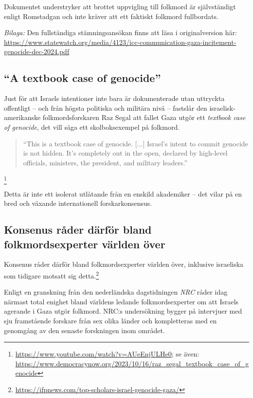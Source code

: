 \documentclass[12pt]{article}
\begin{document}
Dokumentet understryker att brottet uppvigling till folkmord är självständigt enligt Romstadgan och inte kräver att ett faktiskt folkmord fullbordats.

\textit{Bilaga:} Den fullständiga stämningsansökan finns att läsa i originalversion här: \url{https://www.statewatch.org/media/4123/icc-communication-gaza-incitement-genocide-dec-2024.pdf}


\subsection{“A textbook case of genocide”}

Just för att Israels intentioner inte bara är dokumenterade utan uttryckta offentligt – och från högsta politiska och militära nivå – fastslår den israelisk-amerikanske folkmordsforskaren Raz Segal att fallet Gaza utgör ett \textit{textbook case of genocide}, det vill säga ett skolboksexempel på folkmord.

\begin{quote}
“This is a textbook case of genocide. [...] Israel’s intent to commit genocide is not hidden. It’s completely out in the open, declared by high-level officials, ministers, the president, and military leaders.”
\end{quote}

\footnote{\url{https://www.youtube.com/watch?v=AUeEnjULHe0}; se även: \url{https://www.democracynow.org/2023/10/16/raz_segal_textbook_case_of_genocide}}

Detta är inte ett isolerat utlåtande från en enskild akademiker – det vilar på en bred och växande internationell forskarkonsensus.


\subsection{Konsenus råder därför bland folkmordsexperter världen över}


Konsenus råder därför bland folkmordsexperter världen över, inklusive israeliska som tidigare motsatt sig detta.\footnote{\url{https://ifpnews.com/top-scholars-israel-genocide-gaza/}}

Enligt en granskning från den nederländska dagstidningen \textit{NRC} råder idag närmast total enighet bland världens ledande folkmordsexperter om att Israels agerande i Gaza utgör folkmord. NRC:s undersökning bygger på intervjuer med sju framstående forskare från sex olika länder och kompletteras med en genomgång av den senaste forskningen inom området. 
\end{document}
